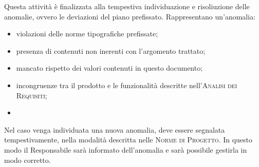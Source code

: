 Questa attività è finalizzata alla tempestiva individuazione e risoliuzione delle anomalie, ovvero le deviazioni del piano prefissato. Rappresentano un'anomalia:
\begin{itemize}
    \item violazioni delle norme tipografiche prefissate;
    \item presenza di contenuti non inerenti con l'argomento trattato;
    \item mancato rispetto dei valori contenuti in questo documento;
    \item incongruenze tra il prodotto e le funzionalità descritte nell'\textsc{Analisi dei Requisiti};
    \item 
\end{itemize}
Nel caso venga individuata una nuova anomalia, deve essere segnalata tempestivamente, nella modalità descritta nelle \textsc{Norme di Progetto}. In questo modo il Responsabile sarà informato dell'anomalia e sarà possibile gestirla in modo corretto.
